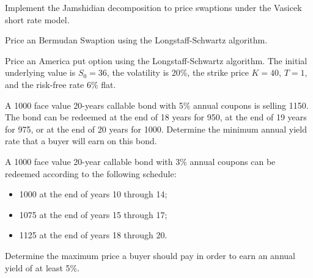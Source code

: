 \documentclass[12pt,a4paper]{book}
\begin{document}
\begin{question}[subtitle=Jamshidian Trick (\texttt{python})]
Implement the Jamshidian decomposition to price swaptions under the Vasicek short rate model.
\end{question}

\begin{question}[subtitle=Longstaff and Schwartz (\texttt{python})]
Price an Bermudan Swaption using the Longstaff-Schwartz algorithm. %
\end{question}

\begin{question}[subtitle=Longstaff and Schwartz (\texttt{python})]
Price an America put option using the Longstaff-Schwartz algorithm. The initial underlying value is $S_0=36$, the volatility is 20\%, the strike price $K=40$, $T=1$, and the risk-free rate 6\% flat.	
\end{question}

\begin{question}[subtitle=Callable Bond (\texttt{python})]
A 1000 face value 20-years callable bond with 5\% annual coupons is selling 1150. The bond can be redeemed at the end of 18 years for 950, at the end of 19 years for 975, or at the end of 20 years for 1000. Determine the minimum annual yield rate that a buyer will earn on this bond.
\end{question}

\begin{question}[subtitle=Callable Bond (\texttt{python})]
A 1000 face value 20-year callable bond with 3\% annual coupons can be redeemed according to the following schedule:
\begin{itemize}
	\item 1000 at the end of years 10 through 14;
	\item 1075 at the end of years 15 through 17;
	\item 1125 at the end of years 18 through 20.
\end{itemize}
Determine the maximum price a buyer should pay in order to earn an annual yield of at least 5\%.
\end{question}
\end{document}
